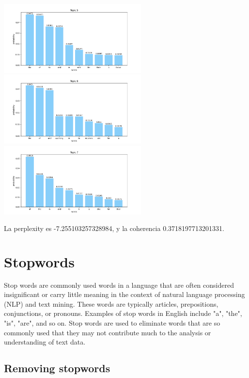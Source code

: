 \documentclass[10pt]{article} %
\begin{document}
\begin{center}
		\includegraphics[width=7.5cm]{images/plots/test_8/topic_5.png}
		\includegraphics[width=7.5cm]{images/plots/test_8/topic_6.png}
		\includegraphics[width=7.5cm]{images/plots/test_8/topic_7.png}
	\end{center}

	La perplexity es -7.255103257328984, y la coherencia  0.3718197713201331.
	
	\section{Stopwords}
	Stop words are commonly used words in a language that are often considered insignificant or carry little meaning in the context of natural language processing (NLP) and text mining. These words are typically articles, prepositions, conjunctions, or pronouns. Examples of stop words in English include "a", "the", "is", "are", and so on. Stop words are used to eliminate words that are so commonly used that they may not contribute much to the analysis or understanding of text data.
	
	\subsection{Removing stopwords}
	
\end{document}
